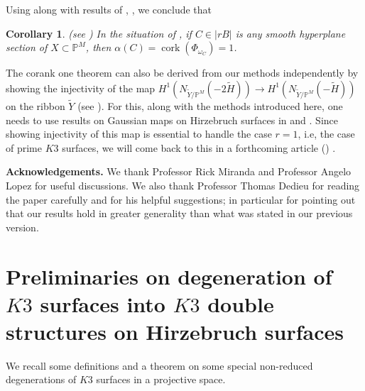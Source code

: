 \documentclass[11pt,twoside]{amsart}
\theoremstyle{plain}
\numberwithin{equation}{section}
\newtheorem{corollary}[theorem]{Corollary}
\theoremstyle{definition}
\begin{document}
\vspace{0.2cm}

\par

Using  along with results of \cite{CDS20}, \cite{ABS17}, we conclude that 

\begin{corollary}\label{corank one intro}(see )
In the situation of , if $C \in |rB|$ is any smooth hyperplane section of $X \subset \mathbb{P}^M$, then $\alpha(C) = \operatorname{cork}(\Phi_{\omega_C}) = 1$.   
\end{corollary}

The corank one theorem can also be derived from our methods  independently by showing the injectivity of the map $H^1(N_{\widetilde{Y}/\mathbb{P}^M}(-2\widetilde{H})) \to H^1(N_{\widetilde{Y}/\mathbb{P}^M}(-\widetilde{H}))$ on the ribbon $\widetilde{Y}$ (see  ). For this, along with the methods introduced here, one needs to use results on Gaussian maps on Hirzebruch surfaces in \cite{DM92} and \cite{DP12}. Since showing injectivity of this map is essential to handle the case $r = 1$, i.e, the case of prime $K3$ surfaces, we will come back to this in a forthcoming article (\cite{BM25}) . 

\vspace{0.2cm}

\noindent\textbf{Acknowledgements.} We thank Professor Rick Miranda and Professor Angelo Lopez for useful discussions. We also thank Professor Thomas Dedieu for reading the paper carefully and for his helpful suggestions; in particular for pointing out that our results hold in greater generality than what was stated in our previous version. 

\section{Preliminaries on degeneration of $K3$ surfaces into $K3$ double structures on Hirzebruch surfaces}

We recall some definitions and a theorem on some special non-reduced degenerations of $K3$ surfaces in a projective space.
\end{document}
